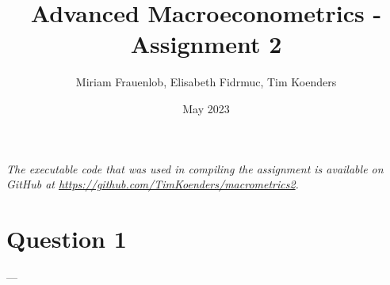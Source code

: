 \documentclass{article}
\title{Advanced Macroeconometrics - Assignment 2}
\author{Miriam Frauenlob, Elisabeth Fidrmuc, Tim Koenders }
\date{May 2023}
\numberwithin{equation}{section}
\begin{document}
\maketitle

\begin{tcolorbox}
\centering \itshape The executable code that was used in compiling the assignment is available on GitHub at \href{https://github.com/TimKoenders/macrometrics2}{https://github.com/TimKoenders/macrometrics2}.
\end{tcolorbox}

\section*{Question 1}
---
\end{document}
